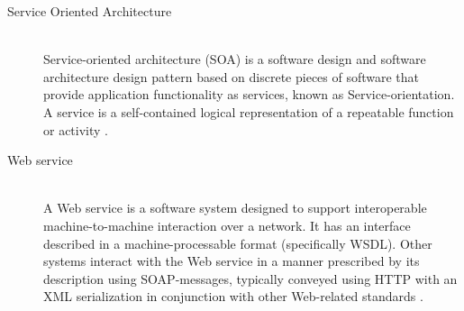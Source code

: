 \begin{description}

 
 \item[Service Oriented Architecture] \hfill \\
 Service-oriented architecture (SOA) is a software design and software architecture design pattern based on discrete pieces of software that provide application functionality as services, known as Service-orientation. A service is a self-contained logical representation of a repeatable function or activity .   
 
  

 \item[Web service] \hfill \\
A Web service is a software system designed to support interoperable machine-to-machine interaction over a network. It has an interface described in a machine-processable format (specifically WSDL). Other systems interact with the Web service in a manner prescribed by its description using SOAP-messages, typically conveyed using HTTP with an XML serialization in conjunction with other Web-related standards .

\end{description}
\label{chapter:ThisIsMyAppendixChapter}
